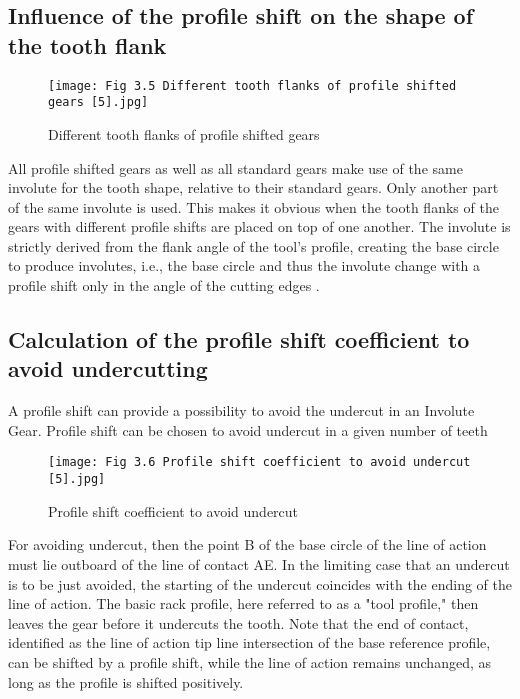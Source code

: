 \documentclass{article}
\begin{document}
\subsection{Influence of the profile shift on the shape of the tooth flank}

\begin{figure}[h]
    \centering
    \texttt{[image: Fig 3.5 Different tooth flanks of profile shifted gears [5].jpg]}
    \caption{ Different tooth flanks of profile shifted gears \cite{Profileshift-of-Involute-Gears5}}
    \label{fig:enter-label}
\end{figure}
All profile shifted gears as well as all standard gears make use of the same involute for the tooth shape, relative to their standard gears. Only another part of the same involute is used. This makes it obvious when the tooth flanks of the gears with different profile shifts are placed on top of one another.
The involute is strictly derived from the flank angle of the tool's profile, creating the base circle to produce involutes, i.e., the base circle and thus the involute change with a profile shift only in the angle of the cutting edges \cite{Profileshift-of-Involute-Gears5}.
\subsection{Calculation of the profile shift coefficient to avoid undercutting}
A profile shift can provide a possibility to avoid the undercut in an Involute Gear. Profile shift can be chosen to avoid undercut in a given number of teeth
\begin{figure}[h]
    \centering
    \texttt{[image: Fig 3.6 Profile shift coefficient to avoid undercut [5].jpg]}
    \caption{ Profile shift coefficient to avoid undercut \cite{Profileshift-of-Involute-Gears5}}
    \label{fig:enter-label}
\end{figure}
For avoiding undercut, then the point B of the base circle of the line of action must lie outboard of the line of contact AE. In the limiting case that an undercut is to be just avoided, the starting of the undercut coincides with the ending of the line of action. The basic rack profile, here referred to as a "tool profile," then leaves the gear before it undercuts the tooth. Note that the end of contact, identified as the line of action tip line intersection of the base reference profile, can be shifted by a profile shift, while the line of action remains unchanged, as long as the profile is shifted positively.
\end{document}
